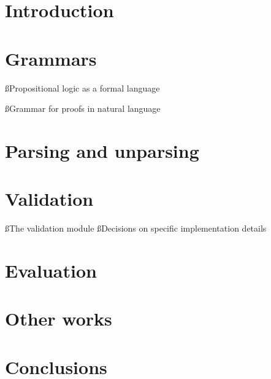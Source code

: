 \documentclass[a4paper]{article}
\title{\tit}
\begin{document}
\begin{titlepage}
\maketitle
\thispagestyle{empty}
\end{titlepage}

\fancyfoot[]{}



\pagebreak
\setcounter{tocdepth}{2}
\tableofcontents
\pagebreak
\lstlistoflistings
\pagebreak
\listoffigures
\clearpage
{}

\section{Introduction} %

\clearpage

\section{Grammars}\label{grams}
\ss{Propositional logic as a formal language}


\ss{Grammar for proofs in natural language}\label{nlgram}


\section{Parsing and unparsing}\label{punp}


\section{Validation}\label{vmod}
\ss{The validation module}
\ss{Decisions on specific implementation details}

\section{Evaluation}

\section{Other works}

\section{Conclusions}
\end{document}
